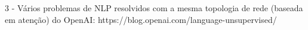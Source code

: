 \documentclass{article}
\begin{document}
3 - Vários problemas de NLP resolvidos com a mesma topologia de rede (baseada em atenção) do OpenAI: https://blog.openai.com/language-unsupervised/\\















\end{document}
